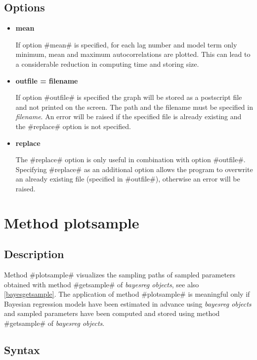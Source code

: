 \subsection*{Options}

\begin{itemize}
\item {\bf mean}

If option #mean# is specified, for each lag number and model term
only minimum, mean and maximum autocorrelations are plotted. This
can lead to a considerable reduction in computing time and storing
size.

\item {\bf outfile = filename}

If option #outfile# is specified the graph will be stored as a
postscript file and not printed on the screen. The path and the
filename must be specified in {\em filename}. An error will be
raised if the specified file is already existing and the #replace#
option is not specified. \item {\bf replace}

The #replace# option is only useful in combination with option
#outfile#. Specifying #replace# as an additional option allows the
program to overwrite an already existing file (specified in
#outfile#), otherwise an error will be raised.
\end{itemize}

\section{Method plotsample}
\label{graphplotsample} 
 

\subsection*{Description}

Method #plotsample# visualizes the sampling paths of sampled
parameters obtained with method #getsample# of {\em bayesreg
objects}, see also \autoref{bayesgetsample}. The application of
method #plotsample# is meaningful only if Bayesian regression
models have been estimated in advance using {\em bayesreg objects}
and sampled parameters have been computed and stored using method
#getsample# of {\em bayesreg objects}.

\subsection*{Syntax}

